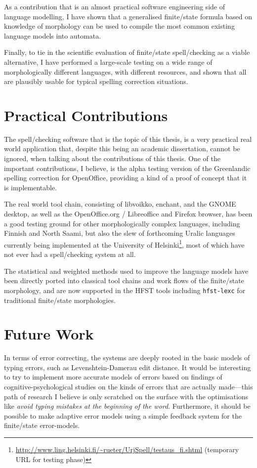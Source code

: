 \documentclass[officiallayout]{unihelcompling}
\begin{document}
As a contribution that is an almost practical software engineering side of
language modelling, I have shown that a generalised finite\-/state formula based
on knowledge of morphology can be used to compile the most common existing
language models into automata.

Finally, to tie in the scientific evaluation of finite\-/state spell\-/checking
as a viable alternative, I have performed a large-scale testing on a wide range
of morphologically different languages, with different resources, and shown
that all are plausibly usable for typical spelling correction situations.


\section{Practical Contributions}
\label{sec:practical-contributions}

The spell\-/checking software that is the topic of this thesis, is a very
practical real world application that, despite this being an academic
dissertation, cannot be ignored, when talking about the contributions of this
thesis. One of the important contributions, I believe, is the alpha testing
version of the Greenlandic spelling correction for OpenOffice, providing a kind
of a proof of concept that it is implementable.

The real world tool chain, consisting of libvoikko, enchant, and the GNOME
desktop, as well as the OpenOffice.org / Libreoffice and Firefox browser, has
been a good testing ground for other morphologically complex languages,
including Finnish and North Saami, but also the slew of forthcoming Uralic
languages currently being implemented at the University of
Helsinki\footnote{\url{http://www.ling.helsinki.fi/~rueter/UrjSpell/testaus_fi.shtml}
(temporary URL for testing phase)}, most of which have not ever had a
spell\-/checking system at all. 

The statistical and weighted methods used to improve the language models have
been directly ported into classical tool chains and work flows of the 
finite\-/state morphology, and are now supported in the HFST tools including
\texttt{hfst-lexc} for traditional finite\-/state morphologies.

\section{Future Work}
\label{sec:future-work}

In terms of error correcting, the systems are deeply rooted in the basic models
of typing errors, such as Levenshtein-Damerau edit distance. It would be
interesting to try to implement more accurate models of errors based on
findings of cognitive-psychological studies on the kinds of errors that are
actually made---this path of research I believe is only scratched on the
surface with the optimisations like \emph{avoid typing mistakes at the
beginning of the word}. Furthermore, it should be possible to make adaptive
error models using a simple feedback system for the finite\-/state
error-models.
\end{document}
